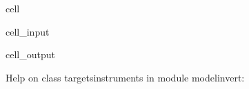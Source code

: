 \documentclass[letterpaper,10pt,english]{jupyterBook}
\begin{document}
\begin{sphinxuseclass}{cell}\begin{sphinxVerbatimInput}

\begin{sphinxuseclass}{cell_input}
\begin{sphinxVerbatim}[commandchars=\\\{\}]
 
\end{sphinxVerbatim}

\end{sphinxuseclass}\end{sphinxVerbatimInput}
\begin{sphinxVerbatimOutput}

\begin{sphinxuseclass}{cell_output}
\begin{sphinxVerbatim}[commandchars=\\\{\}]
Help on class targets\PYGZus{}instruments in module modelinvert:


\end{sphinxVerbatim}
\end{sphinxuseclass}
\end{sphinxVerbatimOutput}
\end{sphinxuseclass}
\end{document}
